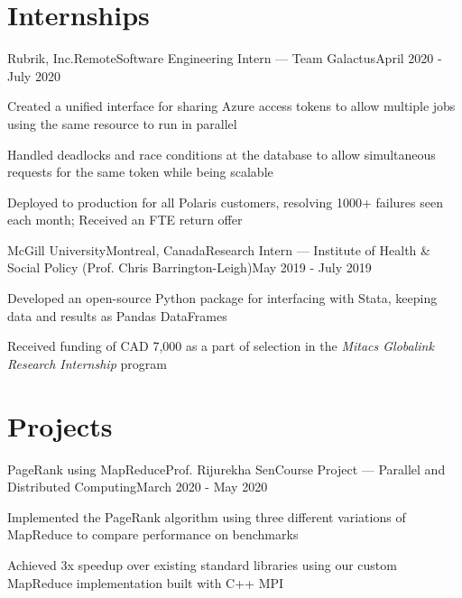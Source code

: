 \documentclass[letterpaper,10pt]{resume}
\begin{document}
\vspace{-0.1cm}
\section{Internships}
\begin{rSubsection}{Rubrik, Inc.}{Remote}{Software Engineering Intern --- Team Galactus}{April 2020 - July 2020}
\item Created a unified interface for sharing Azure access tokens to allow multiple jobs using the same resource to run in parallel
\item Handled deadlocks and race conditions at the database to allow simultaneous requests for the same token while being scalable
\item Deployed to production for all Polaris customers, resolving 1000+ failures seen each month; Received an FTE return offer
\end{rSubsection}
\begin{rSubsection}{McGill University}{Montreal, Canada}{Research Intern --- Institute of Health \& Social Policy (Prof. Chris Barrington-Leigh)}{May 2019 - July 2019}
\item Developed an open-source Python package for interfacing with Stata, keeping data and results as Pandas DataFrames 
\item Received funding of CAD 7,000 as a part of selection in the \textit{Mitacs Globalink Research Internship} program
\end{rSubsection}

\vspace{-0.1cm}
\section{Projects}


\begin{rSubsection}{PageRank using MapReduce}{Prof. Rijurekha Sen}{Course Project --- Parallel and Distributed Computing}{March 2020 - May 2020}
\item Implemented the PageRank algorithm using three different variations of MapReduce to compare performance on benchmarks
\item Achieved 3x speedup over existing standard libraries using our custom MapReduce implementation built with C++ MPI
\end{rSubsection}
\end{document}
